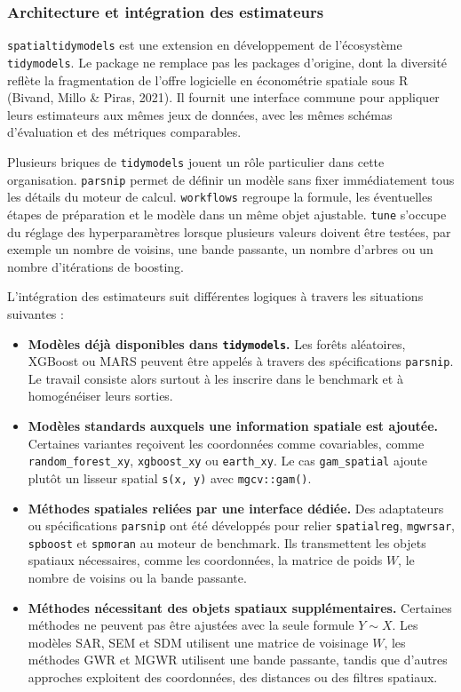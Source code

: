 \documentclass[11pt,a4paper]{article}
\begin{document}
\subsubsection{Architecture et intégration des estimateurs}

\texttt{spatialtidymodels} est une extension en développement de l'écosystème \texttt{tidymodels}. Le package ne remplace pas les packages d'origine, dont la diversité reflète la fragmentation de l'offre logicielle en économétrie spatiale sous R (Bivand, Millo \& Piras, 2021). Il fournit une interface commune pour appliquer leurs estimateurs aux mêmes jeux de données, avec les mêmes schémas d'évaluation et des métriques comparables.

Plusieurs briques de \texttt{tidymodels} jouent un rôle particulier dans cette organisation. \texttt{parsnip} permet de définir un modèle sans fixer immédiatement tous les détails du moteur de calcul. \texttt{workflows} regroupe la formule, les éventuelles étapes de préparation et le modèle dans un même objet ajustable. \texttt{tune} s'occupe du réglage des hyperparamètres lorsque plusieurs valeurs doivent être testées, par exemple un nombre de voisins, une bande passante, un nombre d'arbres ou un nombre d'itérations de boosting.

L'intégration des estimateurs suit différentes logiques à travers les situations suivantes :

\begin{itemize}
    \item \textbf{Modèles déjà disponibles dans \texttt{tidymodels}.}
    Les forêts aléatoires, XGBoost ou MARS peuvent être appelés à travers des spécifications \texttt{parsnip}. Le travail consiste alors surtout à les inscrire dans le benchmark et à homogénéiser leurs sorties.

    \item \textbf{Modèles standards auxquels une information spatiale est ajoutée.}
    Certaines variantes reçoivent les coordonnées comme covariables, comme \texttt{random\_forest\_xy}, \texttt{xgboost\_xy} ou \texttt{earth\_xy}. Le cas \texttt{gam\_spatial} ajoute plutôt un lisseur spatial \texttt{s(x, y)} avec \texttt{mgcv::gam()}.

    \item \textbf{Méthodes spatiales reliées par une interface dédiée.}
    Des adaptateurs ou spécifications \texttt{parsnip} ont été développés pour relier \texttt{spatialreg}, \texttt{mgwrsar}, \texttt{spboost} et \texttt{spmoran} au moteur de benchmark. Ils transmettent les objets spatiaux nécessaires, comme les coordonnées, la matrice de poids $W$, le nombre de voisins ou la bande passante.

    \item \textbf{Méthodes nécessitant des objets spatiaux supplémentaires.}
    Certaines méthodes ne peuvent pas être ajustées avec la seule formule $Y \sim X$. Les modèles SAR, SEM et SDM utilisent une matrice de voisinage $W$, les méthodes GWR et MGWR utilisent une bande passante, tandis que d'autres approches exploitent des coordonnées, des distances ou des filtres spatiaux.
\end{itemize}
\end{document}
